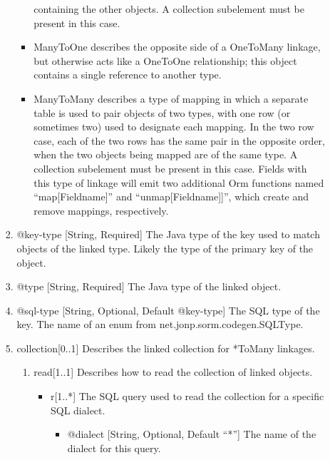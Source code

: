 \documentclass{book}
\begin{document}
\begin{enumerate}
\begin{enumerate}
\begin{enumerate}
\begin{itemize}
                containing the other objects. A collection subelement
                must be present in this case.
                \item ManyToOne describes the opposite side of a OneToMany
                linkage, but otherwise acts like a OneToOne relationship;
                this object contains a single reference to another type.
                \item ManyToMany describes a type of mapping in which a
                separate table is used to pair objects of two types,
                with one row (or sometimes two) used to designate each
                mapping. In the two row case, each of the two rows has
                the same pair in the opposite order, when the two objects
                being mapped are of the same type. A collection subelement must
                be present in this case. Fields with this type of linkage will
                emit two additional Orm functions named ``map[Fieldname]'' and
                ``unmap[Fieldname]]'', which create and remove mappings,
                respectively.
            \end{itemize}
            \item @key-type [String, Required] The Java type of the key used to
                  match objects of the linked type. Likely the type of the
                  primary key of the object.
            \item @type [String, Required] The Java type of the linked object.
            \item @sql-type [String, Optional, Default @key-type] The SQL type
                  of the key. The name of an enum from
                  net.jonp.sorm.codegen.SQLType.
            \item collection[0..1] Describes the linked collection for *ToMany
                  linkages.
            \begin{enumerate}
                \item read[1..1] Describes how to read the collection of linked
                      objects.
                \begin{itemize}
                    \item r[1..*] The SQL query used to read the collection for
                          a specific SQL dialect.
                    \begin{itemize}
                        \item @dialect [String, Optional, Default ``*''] The
                              name of the dialect for this query.

\end{itemize}
\end{itemize}
\end{enumerate}
\end{enumerate}
\end{enumerate}
\end{enumerate}
\end{document}
